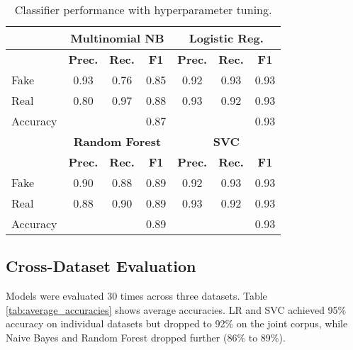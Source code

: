 \documentclass[conference]{IEEEtran}
\begin{document}
\begin{table}[!t]
\caption{Classifier performance with hyperparameter tuning.}
\label{tab:hyperparam_summary}
\begin{center}
\begin{tabular}{|l|ccc|ccc|}
\hline
& \multicolumn{3}{c|}{\textbf{Multinomial NB}} & \multicolumn{3}{c|}{\textbf{Logistic Reg.}} \\
\hline
& \textbf{Prec.} & \textbf{Rec.} & \textbf{F1} & \textbf{Prec.} & \textbf{Rec.} & \textbf{F1} \\
\hline
Fake & 0.93 & 0.76 & 0.85 & 0.92 & 0.93 & 0.93 \\
Real & 0.80 & 0.97 & 0.88 & 0.93 & 0.92 & 0.93 \\
Accuracy & & & 0.87 & & & 0.93 \\
\hline
& \multicolumn{3}{c|}{\textbf{Random Forest}} & \multicolumn{3}{c|}{\textbf{SVC}} \\
\hline
& \textbf{Prec.} & \textbf{Rec.} & \textbf{F1} & \textbf{Prec.} & \textbf{Rec.} & \textbf{F1} \\
\hline
Fake & 0.90 & 0.88 & 0.89 & 0.92 & 0.93 & 0.93 \\
Real & 0.88 & 0.90 & 0.89 & 0.93 & 0.92 & 0.93 \\
Accuracy & & & 0.89 & & & 0.93 \\
\hline
\end{tabular}
\end{center}
\end{table}

\subsection{Cross-Dataset Evaluation}
Models were evaluated 30 times across three datasets. Table \ref{tab:average_accuracies} shows average accuracies. LR and SVC achieved 95\% accuracy on individual datasets but dropped to 92\% on the joint corpus, while Naive Bayes and Random Forest dropped further (86\% to 89\%).
\end{document}
